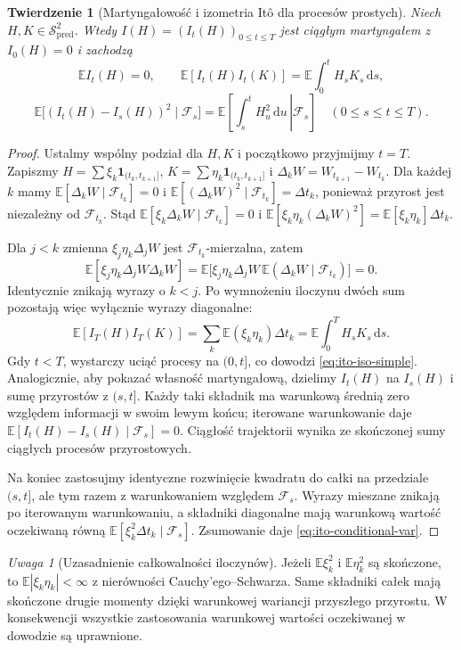 \documentclass[11pt,a4paper,oneside]{report}
\numberwithin{equation}{chapter}
\theoremstyle{plain}
\newtheorem{twierdzenie}{Twierdzenie}[chapter]
\theoremstyle{definition}
\theoremstyle{remark}
\newtheorem{uwaga}{Uwaga}[chapter]
\newcommand{\E}{\mathbb{E}}
\newcommand{\calF}{\mathcal{F}}
\newcommand{\calS}{\mathcal{S}}
\newcommand{\ind}[1]{\mathbf{1}_{#1}}
\newcommand{\dd}{\mathrm{d}}
\begin{document}
\begin{twierdzenie}[Martyngałowość i izometria Itô dla procesów prostych]
\label{th:ito-simple-iso}
Niech $H,K\in\calS_{\mathrm{pred}}^2$. Wtedy
$I(H)=(I_t(H))_{0\le t\le T}$ jest ciągłym
martyngałem z $I_0(H)=0$ i zachodzą
\[
\E I_t(H)=0,\qquad
\E[I_t(H)I_t(K)]
=\E\int_0^tH_sK_s\,\dd s,
\tag{2.3}\label{eq:ito-iso-simple}
\]
\[
\E\big[(I_t(H)-I_s(H))^2\mid\calF_s\big]
=\E\left[\left.\int_s^tH_u^2\,\dd u\,\right|\calF_s\right]
\quad(0\le s\le t\le T).
\tag{2.4}\label{eq:ito-conditional-var}
\]
\end{twierdzenie}
\begin{proof}
Ustalmy wspólny podział dla $H,K$ i początkowo przyjmijmy
$t=T$. Zapiszmy $H=\sum\xi_k\ind{(t_k,t_{k+1}]}$,
$K=\sum\eta_k\ind{(t_k,t_{k+1}]}$ i
$\Delta_kW=W_{t_{k+1}}-W_{t_k}$.
Dla każdej $k$ mamy
$\E[\Delta_kW\mid\calF_{t_k}]=0$ i
$\E[(\Delta_kW)^2\mid\calF_{t_k}]=\Delta t_k$,
ponieważ przyrost jest niezależny od $\calF_{t_k}$.
Stąd
$\E[\xi_k\Delta_kW\mid\calF_{t_k}]=0$ i
$\E[\xi_k\eta_k(\Delta_kW)^2]=\E[\xi_k\eta_k]\Delta t_k$.

Dla $j<k$ zmienna $\xi_j\eta_k\Delta_jW$ jest
$\calF_{t_k}$-mierzalna, zatem
\[
\E[\xi_j\eta_k\Delta_jW\Delta_kW]
=\E\big[\xi_j\eta_k\Delta_jW\,
\E(\Delta_kW\mid\calF_{t_k})\big]=0.
\]
Identycznie znikają wyrazy o $k<j$.
Po wymnożeniu iloczynu dwóch sum pozostają więc
wyłącznie wyrazy diagonalne:
\[
\E[I_T(H)I_T(K)]
=\sum_k\E(\xi_k\eta_k)\Delta t_k
=\E\int_0^TH_sK_s\,\dd s.
\]
Gdy $t<T$, wystarczy uciąć procesy na $(0,t]$,
co dowodzi \eqref{eq:ito-iso-simple}. Analogicznie,
aby pokazać własność martyngałową, dzielimy $I_t(H)$
na $I_s(H)$ i sumę przyrostów z $(s,t]$. Każdy taki
składnik ma warunkową średnią zero względem informacji
w swoim lewym końcu; iterowane warunkowanie daje
$\E[I_t(H)-I_s(H)\mid\calF_s]=0$. Ciągłość trajektorii
wynika ze skończonej sumy ciągłych procesów przyrostowych.

Na koniec zastosujmy identyczne rozwinięcie kwadratu
do całki na przedziale $(s,t]$, ale tym razem z warunkowaniem
względem $\calF_s$. Wyrazy mieszane znikają po iterowanym
warunkowaniu, a składniki diagonalne mają warunkową
wartość oczekiwaną równą
$\E[\xi_k^2\Delta t_k\mid\calF_s]$.
Zsumowanie daje \eqref{eq:ito-conditional-var}.
\end{proof}

\begin{uwaga}[Uzasadnienie całkowalności iloczynów]
Jeżeli $\E\xi_k^2$ i $\E\eta_k^2$ są skończone,
to $\E|\xi_k\eta_k|<\infty$ z nierówności
Cauchy'ego--Schwarza. Same składniki całek mają skończone
drugie momenty dzięki warunkowej wariancji przyszłego
przyrostu. W konsekwencji wszystkie zastosowania
warunkowej wartości oczekiwanej w dowodzie są uprawnione.
\end{uwaga}
\end{document}
